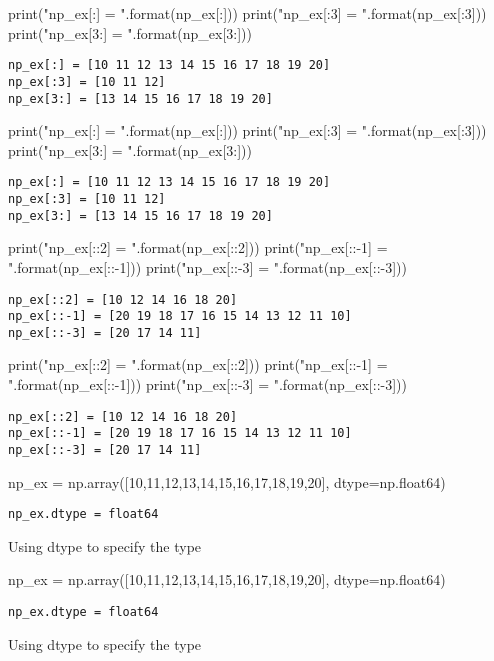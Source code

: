 \begin{python}
print("np_ex[:] = {}".format(np_ex[:]))
print("np_ex[:3] = {}".format(np_ex[:3]))
print("np_ex[3:] = {}".format(np_ex[3:]))
\end{python}
\begin{lstlisting}[style=pyOutStyle]
np_ex[:] = [10 11 12 13 14 15 16 17 18 19 20]
np_ex[:3] = [10 11 12]
np_ex[3:] = [13 14 15 16 17 18 19 20]
\end{lstlisting}
\begin{python}
print("np_ex[:] = {}".format(np_ex[:]))
print("np_ex[:3] = {}".format(np_ex[:3]))
print("np_ex[3:] = {}".format(np_ex[3:]))
\end{python}
\begin{lstlisting}[style=pyOutStyle]
np_ex[:] = [10 11 12 13 14 15 16 17 18 19 20]
np_ex[:3] = [10 11 12]
np_ex[3:] = [13 14 15 16 17 18 19 20]
\end{lstlisting}


\begin{python}
print("np_ex[::2] = {}".format(np_ex[::2]))
print("np_ex[::-1] = {}".format(np_ex[::-1]))
print("np_ex[::-3] = {}".format(np_ex[::-3]))
\end{python}
\begin{lstlisting}[style=pyOutStyle]
np_ex[::2] = [10 12 14 16 18 20]
np_ex[::-1] = [20 19 18 17 16 15 14 13 12 11 10]
np_ex[::-3] = [20 17 14 11]
\end{lstlisting}
\begin{python}
print("np_ex[::2] = {}".format(np_ex[::2]))
print("np_ex[::-1] = {}".format(np_ex[::-1]))
print("np_ex[::-3] = {}".format(np_ex[::-3]))
\end{python}
\begin{lstlisting}[style=pyOutStyle]
np_ex[::2] = [10 12 14 16 18 20]
np_ex[::-1] = [20 19 18 17 16 15 14 13 12 11 10]
np_ex[::-3] = [20 17 14 11]
\end{lstlisting}


\begin{python}
np_ex = np.array([10,11,12,13,14,15,16,17,18,19,20], dtype=np.float64)
\end{python}
\begin{lstlisting}[style=pyOutStyle]
np_ex.dtype = float64
\end{lstlisting}
\begin{markdown}
Using dtype to specify the type
\end{markdown}
\begin{python}
np_ex = np.array([10,11,12,13,14,15,16,17,18,19,20], dtype=np.float64)
\end{python}
\begin{lstlisting}[style=pyOutStyle]
np_ex.dtype = float64
\end{lstlisting}
\begin{markdown}
Using dtype to specify the type
\end{markdown}



